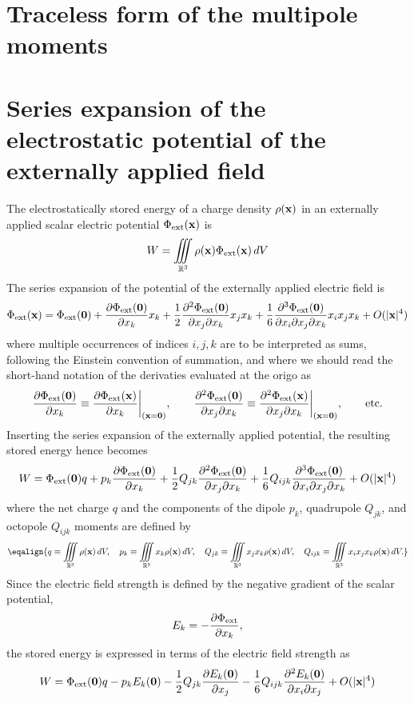 \section{Traceless form of the multipole moments}


\section{Series expansion of the electrostatic potential of the externally
         applied field}
The electrostatically stored energy of a charge density $\rho({\bf x})$ in an
externally applied scalar electric potential $\Phi_{\rm ext}({\bf x})$ is
$$
  W=\iiint_{{\Bbb R}^3}\rho({\bf x})\Phi_{\rm ext}({\bf x})\,dV
$$
The series expansion of the potential of the externally applied electric field
is
$$
  \Phi_{\rm ext}({\bf x})
    =\Phi_{\rm ext}({\bf 0})
      +{{\partial \Phi_{\rm ext}({\bf 0})}\over{\partial x_k}} x_k
      +{{1}\over{2}}{{\partial^2\Phi_{\rm ext}({\bf 0})}
                \over{\partial x_j\partial x_k}} x_j x_k
      +{{1}\over{6}}{{\partial^3\Phi_{\rm ext}({\bf 0})}
                    \over{\partial x_i\partial x_j\partial x_k}} x_i x_j x_k
      +O(|{\bf x}|^4)
$$
where multiple occurrences of indices $i,j,k$ are to be interpreted as sums,
following the Einstein convention of summation, and where we should read the
short-hand notation of the derivaties evaluated at the origo as
$$
  {{\partial \Phi_{\rm ext}({\bf 0})}\over{\partial x_k}}
    \equiv{{\partial \Phi_{\rm ext}({\bf x})}\over{\partial x_k}}
        \bigg|_{({\bf x}={\bf 0})},\qquad
  {{\partial^2\Phi_{\rm ext}({\bf 0})}\over{\partial x_j\partial x_k}}
  \equiv{{\partial^2\Phi_{\rm ext}({\bf x})}\over{\partial x_j\partial x_k}}
        \bigg|_{({\bf x}={\bf 0})},
  \qquad\hbox{etc.}
$$
Inserting the series expansion of the externally applied potential, the
resulting stored energy hence becomes
$$
  W=\Phi_{\rm ext}({\bf 0})q
    +p_k{{\partial \Phi_{\rm ext}({\bf 0})}\over{\partial x_k}}
    +{{1}\over{2}}Q_{jk}{{\partial^2\Phi_{\rm ext}({\bf 0})}
              \over{\partial x_j\partial x_k}}
    +{{1}\over{6}}Q_{ijk}{{\partial^3\Phi_{\rm ext}({\bf 0})}
                  \over{\partial x_i\partial x_j\partial x_k}}
    +O(|{\bf x}|^4)
$$
where the net charge $q$ and the components of the dipole $p_k$, quadrupole
$Q_{jk}$, and octopole $Q_{ijk}$ moments are defined by
$$
  \eqalign{
   q\equiv\iiint_{{\Bbb R}^3}\rho({\bf x})\,dV,\quad
   p_k\equiv\iiint_{{\Bbb R}^3}x_k\rho({\bf x})\,dV,\quad
   Q_{jk}\equiv\iiint_{{\Bbb R}^3}x_j x_k\rho({\bf x})\,dV,\quad
   Q_{ijk}\equiv\iiint_{{\Bbb R}^3}x_i x_j x_k\rho({\bf x})\,dV.
  }
$$
Since the electric field strength is defined by the negative gradient of the
scalar potential,
$$
  E_k = -{{\partial\Phi_{\rm ext}}\over{\partial x_k}},
$$
the stored energy is expressed in terms of the electric field strength as
$$
  W=\Phi_{\rm ext}({\bf 0})q
    -p_k E_k({\bf 0})
    -{{1}\over{2}}Q_{jk}{{\partial E_k({\bf 0})}\over{\partial x_j}}
    -{{1}\over{6}}Q_{ijk}{{\partial^2 E_k({\bf 0})}
                  \over{\partial x_i\partial x_j}}
    +O(|{\bf x}|^4)
$$


